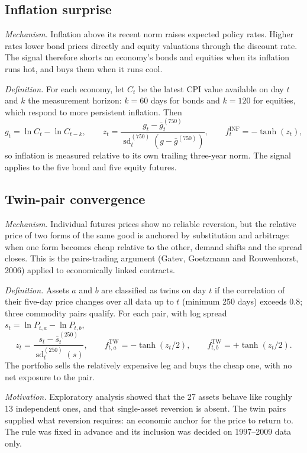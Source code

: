 \documentclass[10.5pt,a4paper]{article}
\begin{document}
\subsection{Inflation surprise}
\textit{Mechanism.} Inflation above its recent norm raises expected policy rates. Higher rates lower bond prices directly and equity valuations through the discount rate. The signal therefore shorts an economy's bonds and equities when its inflation runs hot, and buys them when it runs cool.

\textit{Definition.} For each economy, let $C_t$ be the latest CPI value available on day $t$ and $k$ the measurement horizon: $k=60$ days for bonds and $k=120$ for equities, which respond to more persistent inflation. Then
\begin{equation}
g_t=\ln C_t-\ln C_{t-k},\qquad
z_t=\frac{g_t-\bar g^{(750)}_t}{\operatorname{sd}^{(750)}_t\!\left(g-\bar g^{(750)}\right)},\qquad
f^{\mathrm{INF}}_t=-\tanh(z_t),
\end{equation}
so inflation is measured relative to its own trailing three-year norm. The signal applies to the five bond and five equity futures.

\subsection{Twin-pair convergence}
\textit{Mechanism.} Individual futures prices show no reliable reversion, but the relative price of two forms of the same good is anchored by substitution and arbitrage: when one form becomes cheap relative to the other, demand shifts and the spread closes. This is the pairs-trading argument (Gatev, Goetzmann and Rouwenhorst, 2006) applied to economically linked contracts.

\textit{Definition.} Assets $a$ and $b$ are classified as twins on day $t$ if the correlation of their five-day price changes over all data up to $t$ (minimum 250 days) exceeds 0.8; three commodity pairs qualify. For each pair, with log spread $s_t=\ln P_{t,a}-\ln P_{t,b}$,
\begin{equation}
z_t=\frac{s_t-\bar s^{(250)}_t}{\operatorname{sd}^{(250)}_t(s)},\qquad
f^{\mathrm{TW}}_{t,a}=-\tanh(z_t/2),\qquad f^{\mathrm{TW}}_{t,b}=+\tanh(z_t/2).
\end{equation}
The portfolio sells the relatively expensive leg and buys the cheap one, with no net exposure to the pair.

\textit{Motivation.} Exploratory analysis showed that the 27 assets behave like roughly 13 independent ones, and that single-asset reversion is absent. The twin pairs supplied what reversion requires: an economic anchor for the price to return to. The rule was fixed in advance and its inclusion was decided on 1997--2009 data only.
\end{document}
